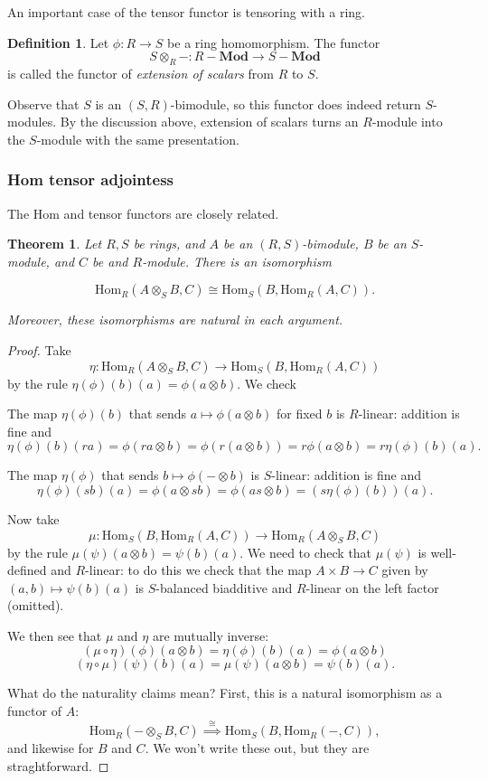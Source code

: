\documentclass{amsart}[12pt]
\newcommand{\Hom}{\mathrm{Hom}}
\newcommand{\DEF}[1]{\emph{#1}\index{#1}}
\numberwithin{equation}{section}
\theoremstyle{plain} %
\newtheorem{thm}[equation]{Theorem}
\theoremstyle{definition}
\newtheorem{defn}[equation]{Definition}
\theoremstyle{remark}
\newcommand{\sssec}[1]{\subsubsection{#1}}
\newcommand{\Mod}[1]{#1-\mathbf{Mod}}
\begin{document}
An important case of the tensor functor is tensoring with a ring.

\begin{defn}
Let $\phi: R \to S$ be a ring homomorphism. The functor
\[ S \otimes_R - : \Mod{R} \to \Mod{S}\]
is called the functor of \DEF{extension of scalars} from $R$ to $S$.
\end{defn}

Observe that $S$ is an $(S,R)$-bimodule, so this functor does indeed return $S$-modules. By the discussion above, extension of scalars turns an $R$-module into the $S$-module with the same presentation.


\sssec{Hom tensor adjointess}

The Hom and tensor functors are closely related.

\begin{thm} Let $R,S$ be rings, and $A$ be an $(R,S)$-bimodule, $B$ be an $S$-module, and $C$ be and $R$-module. There is an isomorphism

\[ \Hom_R(A\otimes_S B, C) \cong \Hom_S(B,\Hom_R(A,C)).\]

Moreover, these isomorphisms are natural in each argument.
\end{thm}
\begin{proof}
Take 
\[\eta:\Hom_R(A\otimes_S B, C) \to \Hom_S(B,\Hom_R(A,C)) \]
by the rule $\eta(\phi)(b)(a) = \phi(a\otimes b)$. We check

The map $\eta(\phi)(b)$ that sends $a\mapsto \phi(a\otimes b)$ for fixed $b$ is $R$-linear: addition is fine and \[\eta(\phi)(b)(ra)=\phi(ra \otimes b) = \phi(r(a\otimes b))=r\phi(a \otimes b) = r \eta(\phi)(b)(a). \]

The map $\eta(\phi)$ that sends $b \mapsto \phi(-\otimes b)$ is $S$-linear: addition is fine and
\[ \eta(\phi)(sb)(a)= \phi(a \otimes sb) = \phi(as \otimes b) = (s\eta(\phi)(b))(a).\]

Now take
\[ \mu: \Hom_S(B,\Hom_R(A,C)) \to \Hom_R(A\otimes_S B, C) \]
by the rule $\mu(\psi)(a\otimes b) = \psi(b)(a)$.
We need to check that $\mu(\psi)$ is well-defined and $R$-linear: to do this we check that the map $A\times B \to C$ given by $(a,b)\mapsto \psi(b)(a)$ is $S$-balanced biadditive and $R$-linear on the left factor (omitted). 

We then see that $\mu$ and $\eta$ are mutually inverse: 
\[(\mu\circ\eta)(\phi)(a\otimes b) = \eta(\phi)(b)(a) = \phi(a\otimes b)\]
\[ (\eta\circ \mu)(\psi)(b)(a) = \mu(\psi)(a\otimes b) = \psi(b)(a).\]

What do the naturality claims mean? First, this is a natural isomorphism as a functor of $A$:
\[ \Hom_R( - \otimes_S B, C) \stackrel{\cong}{\implies} \Hom_S( B,\Hom_R(-,C)),\]
and likewise for $B$ and $C$. We won't write these out, but they are straghtforward.
\end{proof}
\end{document}
